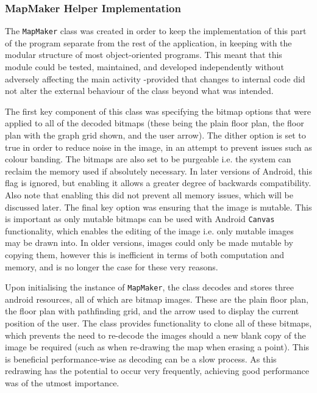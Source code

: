 \documentclass[12pt,a4paper]{report}
\begin{document}
                \subsubsection{MapMaker Helper Implementation}
                    \label{subsec:MapMaker}
                    The \texttt{MapMaker} class was created in order to keep the implementation of this part of the program separate from the rest of the application, in keeping
                    with the modular structure of most object-oriented programs. This meant that this module could be tested, maintained, and developed independently without 
                    adversely affecting the main activity -provided that changes to internal code did not alter the external behaviour of the class beyond what was intended.
                    
                    The first key component of this class was specifying the bitmap options that were applied to all of the decoded bitmaps (these being the plain floor plan,
                    the floor plan with the graph grid shown, and the user arrow).
                    The dither option is set to true in order to reduce noise in the image, in an attempt to prevent issues such as colour
                    banding. The bitmaps are also set to be purgeable i.e. the system can reclaim the memory used if absolutely necessary. In later versions of Android, this flag
                    is ignored, but enabling it allows a greater degree of backwards compatibility. Also note that enabling this did not prevent all memory issues, which will be discussed
                    later. The final key option was ensuring that the image is mutable. This is important as only mutable bitmaps can be used with Android
                    \texttt{Canvas} functionality, which enables the editing of the image i.e. only mutable images may be drawn into. In older versions, images could only be
                    made mutable by copying them, however this is inefficient in terms of both computation and memory, and is no longer the case for these very reasons.
                    
                    Upon initialising the instance of \texttt{MapMaker}, the class decodes and stores three android resources, all of which are bitmap images. These are the plain
                    floor plan, the floor plan with pathfinding grid, and the arrow used to display the current position of the user. The class provides functionality to clone
                    all of these bitmaps, which prevents the need to re-decode the images should a new blank copy of the image be required (such as when re-drawing the map
                    when erasing a point). This is beneficial performance-wise as decoding can be a slow process. As this redrawing has the potential to occur very frequently,
                    achieving good performance was of the utmost importance.
                    
\end{document}
